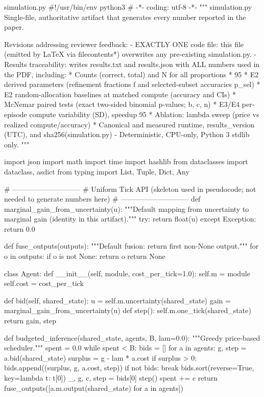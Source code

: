 \begin{filecontents*}{simulation.py}
#!/usr/bin/env python3
# -*- coding: utf-8 -*-
"""
simulation.py
Single-file, authoritative artifact that generates every number reported in the paper.

Revisions addressing reviewer feedback:
- EXACTLY ONE code file: this file (emitted by LaTeX via filecontents*) overwrites any pre-existing simulation.py.
- Results traceability: writes results.txt and results.json with ALL numbers used in the PDF, including:
  * Counts (correct, total) and N for all proportions
  * 95%
  * E2 derived parameters (refinement fractions f and selected-subset accuracies p_sel)
  * E2 random-allocation baselines at matched compute (accuracy and CIs)
  * McNemar paired tests (exact two-sided binomial p-values; b, c, n)
  * E3/E4 per-episode compute variability (SD), speedup 95%
  * Ablation: lambda sweep (price vs realized compute/accuracy)
  * Canonical and measured runtime, results_version (UTC), and sha256(simulation.py)
- Deterministic, CPU-only, Python 3 stdlib only.
"""

import json
import math
import time
import hashlib
from dataclasses import dataclass, asdict
from typing import List, Tuple, Dict, Any


# -----------------------------
# Uniform Tick API (skeleton used in pseudocode; not needed to generate numbers here)
# -----------------------------
def marginal_gain_from_uncertainty(u):
    """Default mapping from uncertainty to marginal gain (identity in this artifact)."""
    try:
        return float(u)
    except Exception:
        return 0.0


def fuse_outputs(outputs):
    """Default fusion: return first non-None output."""
    for o in outputs:
        if o is not None:
            return o
    return None


class Agent:
    def __init__(self, module, cost_per_tick=1.0):
        self.m = module
        self.cost = cost_per_tick

    def bid(self, shared_state):
        u = self.m.uncertainty(shared_state)
        gain = marginal_gain_from_uncertainty(u)
        def step():
            self.m.one_tick(shared_state)
        return gain, step


def budgeted_inference(shared_state, agents, B, lam=0.0):
    """Greedy price-based scheduler."""
    spent = 0.0
    while spent < B:
        bids = []
        for a in agents:
            g, step = a.bid(shared_state)
            surplus = g - lam * a.cost
            if surplus > 0:
                bids.append((surplus, g, a.cost, step))
        if not bids:
            break
        bids.sort(reverse=True, key=lambda t: t[0])
        _, g, c, step = bids[0]
        step()
        spent += c
    return fuse_outputs([a.m.output(shared_state) for a in agents])



\end{filecontents*}
